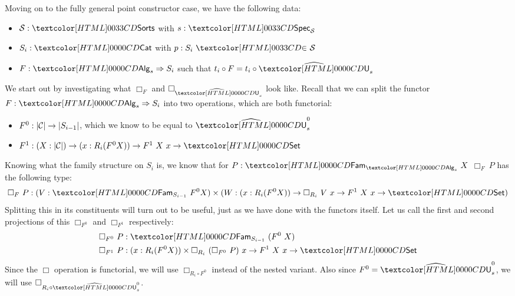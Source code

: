 Moving on to the fully general point constructor case, we have the
following data:
%
\begin{itemize}
\item $\Ss : \sortsty$ with $s : \specty_{\Ss}$
\item $S_i : \Cat$ with $p : \sortsin{S_i}{\Ss}$
\item $F : \Func{\Alg_s}{S_i}$ such that $t_i \circ F = t_i \circ \extendfunc{\Und}_s$
\end{itemize}

We start out by investigating what $\Box_F$ and $\Box_{\extendfunc{\Und}_s}$ look
like. Recall that we can split the functor $F : \Func{\Alg_s}{S_i}$
into two operations, which are both functorial:
\begin{itemize}
\item $F^0 : | \mathcal{C} | \to |S_{i-1}|$, which we know to be equal to $\extendfunc{\Und}^0_s$
\item
  $F^1 : (X : | \Cc |) \to (x : R_i (F^0 X)) \to F^1\ X\ x \to \Set$
\end{itemize}

Knowing what the family structure on $S_i$ is, we know that for
$P : \Fam_{\Alg_s}\ X$ $\Box_F\ P$ has the following type:
$$
\Box_F\ P : (V : \Fam_{S_{i-1}}\ F^0X) \times (W : (x : R_i (F^0 X)) \to \Box_{R_i}\ V\ x \to F^1\ X\ x \to \Set)
$$
Splitting this in its constituents will turn out to be useful, just as
we have done with the functors itself. Let us call the first and
second projections of this $\Box_{F^0}$ and $\Box_{F^1}$ respectively:
%
\begin{align*}
  &\Box_{F^0}\ P : \Fam_{S_{i-1}}\ (F^0\ X) \\
  &\Box_{F^1}\ P : (x : R_i (F^0 X)) \times \Box_{R_i}\ (\Box_{F^0}\ P)\ x \to F^1\ X\ x \to \Set
\end{align*}
%
Since the $\Box$ operation is functorial, we will use
$\Box_{R_i \circ F^0}$ instead of the nested variant. Also since
$F^0 = \extendfunc{\Und}^0_s$, we will use $\Box_{R_i \circ \extendfunc{\Und}^0_s}$.

